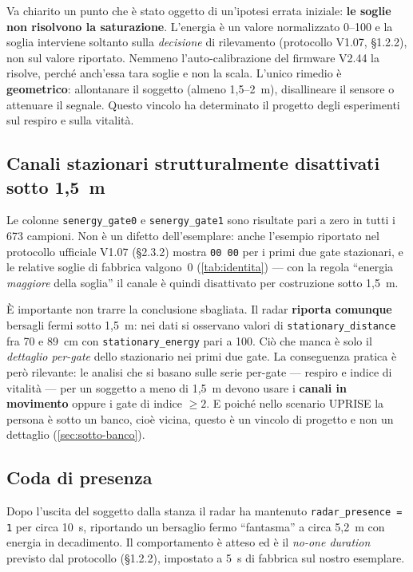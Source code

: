 Va chiarito un punto che è stato oggetto di un'ipotesi errata iniziale: \textbf{le
soglie non risolvono la saturazione}. L'energia è un valore normalizzato 0--100 e
la soglia interviene soltanto sulla \emph{decisione} di rilevamento (protocollo
V1.07, \S1.2.2), non sul valore riportato. Nemmeno l'auto-calibrazione del firmware
V2.44 la risolve, perché anch'essa tara soglie e non la scala. L'unico rimedio è
\textbf{geometrico}: allontanare il soggetto (almeno 1,5--2~m), disallineare il
sensore o attenuare il segnale. Questo vincolo ha determinato il progetto degli
esperimenti sul respiro e sulla vitalità.

\subsection{Canali stazionari strutturalmente disattivati sotto 1,5~m}
\label{sec:senergy-zero}

Le colonne \texttt{senergy\_gate0} e \texttt{senergy\_gate1} sono risultate pari a
zero in tutti i 673 campioni. Non è un difetto dell'esemplare: anche l'esempio
riportato nel protocollo ufficiale V1.07 (\S2.3.2) mostra \texttt{00 00} per i
primi due gate stazionari, e le relative soglie di fabbrica valgono~0
(\cref{tab:identita}) --- con la regola ``energia \emph{maggiore} della soglia'' il
canale è quindi disattivato per costruzione sotto 1,5~m.

È importante non trarre la conclusione sbagliata. Il radar \textbf{riporta comunque}
bersagli fermi sotto 1,5~m: nei dati si osservano valori di
\texttt{stationary\_distance} fra 70 e 89~cm con \texttt{stationary\_energy} pari a
100. Ciò che manca è solo il \emph{dettaglio per-gate} dello stazionario nei primi
due gate. La conseguenza pratica è però rilevante: le analisi che si basano sulle
serie per-gate --- respiro e indice di vitalità --- per un soggetto a meno di 1,5~m
devono usare i \textbf{canali in movimento} oppure i gate di indice $\geq 2$.
E poiché nello scenario UPRISE la persona è sotto un banco, cioè vicina, questo è
un vincolo di progetto e non un dettaglio (\cref{sec:sotto-banco}).

\subsection{Coda di presenza}
\label{sec:coda}

Dopo l'uscita del soggetto dalla stanza il radar ha mantenuto
\texttt{radar\_presence = 1} per circa 10~s, riportando un bersaglio fermo
``fantasma'' a circa 5,2~m con energia in decadimento. Il comportamento è atteso ed
è il \emph{no-one duration} previsto dal protocollo (\S1.2.2), impostato a 5~s di
fabbrica sul nostro esemplare.

